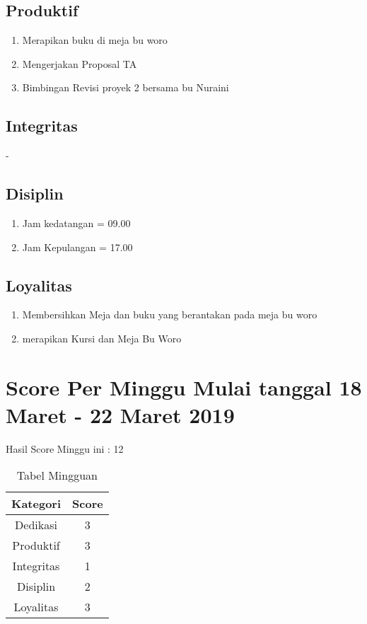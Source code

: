 \subsection{Produktif}
\begin{enumerate}
\item Merapikan buku di meja bu woro
\item Mengerjakan Proposal TA
\item Bimbingan Revisi proyek 2 bersama bu Nuraini
\end{enumerate}
\subsection{Integritas}
-
\subsection{Disiplin}
\begin{enumerate}
\item Jam kedatangan =  09.00
\item Jam Kepulangan = 17.00
\end{enumerate}
\subsection{Loyalitas}
\begin{enumerate}
\item Membersihkan Meja dan buku yang berantakan pada meja bu woro
\item merapikan Kursi dan Meja Bu Woro
\end{enumerate}

\section {Score Per Minggu Mulai tanggal 18 Maret - 22 Maret 2019}
Hasil Score Minggu ini : 12
\begin{table}[h]
\caption{Tabel Mingguan}
\centering
\begin{tabular}{|c|c|}
\hline
\textbf{Kategori}&\textbf{Score}\\
\hline
Dedikasi&3\\
\hline
Produktif&3\\
\hline
Integritas&1\\
\hline
Disiplin&2\\
\hline
Loyalitas&3\\
\hline
\end{tabular}
\label{tsble:Laporan mingguan}
\end{table}


